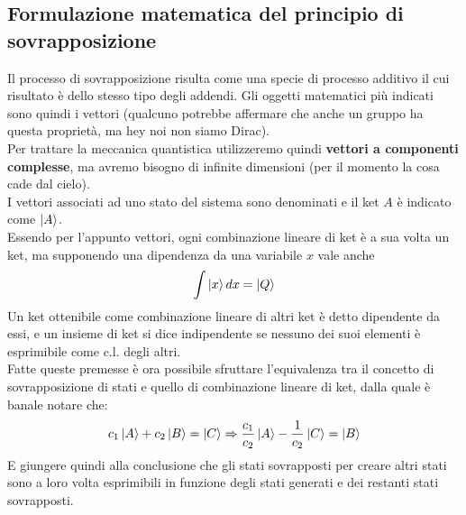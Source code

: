 \documentclass[../../../../Meccanica_quantistica]{subfiles}
\begin{document}
\subsection{
  Formulazione matematica del principio di sovrapposizione
}
  \label{
    subsec:formulazione-matematica-del-principio-di-sovrapposizione
  }
  Il processo di sovrapposizione risulta come una specie di
  processo additivo il cui risultato è dello stesso tipo degli
  addendi.
  Gli oggetti matematici più indicati sono quindi i vettori
  (qualcuno potrebbe affermare che anche un gruppo ha questa
  proprietà, ma hey noi non siamo Dirac). \\
  Per trattare la meccanica quantistica utilizzeremo quindi
  \textbf{vettori a componenti complesse}, ma avremo bisogno di
  infinite dimensioni (per il momento la cosa cade dal cielo). \\
  I vettori associati ad uno stato del sistema sono denominati
   e il ket $A$ è indicato come
  $\ket{A}$. \\
  Essendo per l'appunto vettori, ogni combinazione lineare di ket è
  a sua volta un ket, ma supponendo una dipendenza da una variabile
  $x$ vale anche
  \begin{equation*}
    \int \ket{x} dx = \ket{Q}
  \end{equation*}
  Un ket ottenibile come combinazione lineare di altri ket è detto
  dipendente da essi, e un insieme di ket si dice indipendente se
  nessuno dei suoi elementi è esprimibile come c.l. degli altri. \\
  Fatte queste premesse è ora possibile sfruttare l'equivalenza tra
  il concetto di sovrapposizione di stati e quello di combinazione
  lineare di ket, dalla quale è banale notare che:
  \begin{equation*}
    c_1 \ket{A} + c_2\ket{B} = \ket{C} \Rightarrow
    \frac{c_1}{c_2} \ket{A} - \frac{1}{c_2} \ket{C} = \ket{B}
  \end{equation*}
  E giungere quindi alla conclusione che gli stati sovrapposti per
  creare altri stati sono a loro volta esprimibili in funzione degli
  stati generati e dei restanti stati sovrapposti. \\
\end{document}

